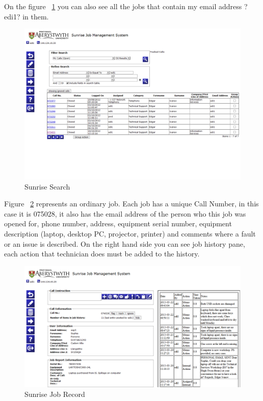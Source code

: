 \documentclass[10pt,a4paper,headinclude=true]{report}
\begin{document}
On the figure ~\ref{fig:sunrise_search} you can also see all the jobs that contain my email address ?edi1? in them.

\begin{figure}[H]
\centering
\centerline{\includegraphics[scale=0.5]{./sunrise_search}}
\caption{Sunrise Search}
\label{fig:sunrise_search}
\end{figure}


Figure ~\ref{fig:sunrise_job} represents an ordinary job. Each job has a unique Call Number, in this case it is 075028, it also has the email address of the person who this job was opened for, phone number, address, equipment serial number, equipment description (laptop, desktop PC, projector, printer) and comments where a fault or an issue is described. On the right hand side you can see job history pane, each action that technician does must be added to the history.

\begin{figure}[H]
\centering
\centerline{\includegraphics[scale=0.5]{./sunrise_job}}
\caption{Sunrise Job Record}
\label{fig:sunrise_job}
\end{figure}
\end{document}
